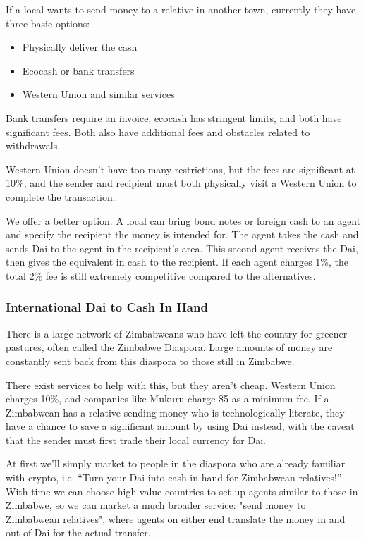 \documentclass{article}
\begin{document}
If a local wants to send money to a relative in another town, currently they have three basic options:

\begin{itemize}
	\item Physically deliver the cash
	\item Ecocash or bank transfers
	\item Western Union and similar services
\end{itemize}	

Bank transfers require an invoice, ecocash has stringent limits, and both have significant fees. Both also have additional fees and obstacles related to withdrawals.

Western Union doesn't have too many restrictions, but the fees are significant at 10\%, and the sender and recipient must both physically visit a Western Union to complete the transaction.

We offer a better option. A local can bring bond notes or foreign cash to an agent and specify the recipient the money is intended for. The agent takes the cash and sends Dai to the agent in the recipient's area. This second agent receives the Dai, then gives the equivalent in cash to the recipient. If each agent charges 1\%, the total 2\% fee is still extremely competitive compared to the alternatives.

\subsubsection{International Dai to Cash In Hand} \label{remittance}

There is a large network of Zimbabweans who have left the country for greener pastures, often called the \href{https://en.wikipedia.org/wiki/Zimbabwean_diaspora}{Zimbabwe Diaspora}. Large amounts of money are constantly sent back from this diaspora to those still in Zimbabwe.

There exist services to help with this, but they aren't cheap. Western Union charges 10\%, and companies like Mukuru charge \$5 as a minimum fee. If a Zimbabwean has a relative sending money who is technologically literate, they have a chance to save a significant amount by using Dai instead, with the caveat that the sender must first trade their local currency for Dai.

At first we'll simply market to people in the diaspora who are already familiar with crypto, i.e. ``Turn your Dai into cash-in-hand for Zimbabwean relatives!'' With time we can choose high-value countries to set up agents similar to those in Zimbabwe, so we can market a much broader service: "send money to Zimbabwean relatives", where agents on either end translate the money in and out of Dai for the actual transfer.
\end{document}
